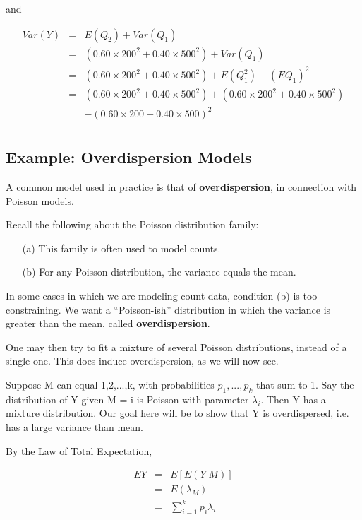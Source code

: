 \documentclass[11pt]{article}
\begin{document}
and 

\begin{eqnarray}
Var(Y) &=& E(Q_2) + Var(Q_1) \\
&=& (0.60 \times 200^2 + 0.40 \times 500^2) + Var(Q_1) \\
&=& (0.60 \times 200^2 + 0.40 \times 500^2) + E(Q_1^2) - (EQ_1)^2 \\
&=& (0.60 \times 200^2 + 0.40 \times 500^2) + (0.60 \times 200^2 + 0.40
\times 500^2)  \\
& & - (0.60 \times 200 + 0.40 \times 500)^2 \\
\end{eqnarray}

\subsection{Example:  Overdispersion Models}

A common model used in practice is that of {\bf overdispersion}, in
connection with Poisson models.  

Recall the following about the Poisson distribution family:

\begin{itemize}

\item [(a)] This family is often used to model counts.

\item [(b)] For any Poisson distribution, the variance equals the mean.

\end{itemize}

In some cases in which we are modeling count data, condition (b) is too
constraining.  We want a ``Poisson-ish''
distribution in which the variance is greater
than the mean, called {\bf overdispersion}.  

One may then try to fit a mixture of several Poisson distributions,
instead of a single one.  This does induce overdispersion, as we will
now see.  

Suppose M can equal 1,2,...,k, with probabilities $p_1,...,p_k$ that sum
to 1.  Say the distribution of Y given M = i is Poisson with parameter
$\lambda_i$.  Then Y has a mixture distribution.  Our goal here will be
to show that Y is overdispersed, i.e. has a large variance than mean.

By the Law of Total Expectation,

\begin{eqnarray}
\label{meanlamb}
EY &=& E[E(Y|M)] \\ 
&=& E(\lambda_M) \label{elambm} \\
&=& \sum_{i=1}^k p_i \lambda_i
\end{eqnarray}
\end{document}
